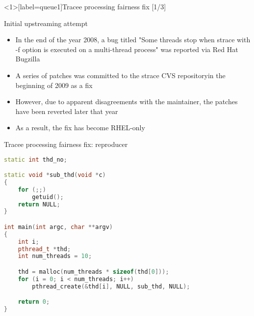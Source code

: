 \documentclass[unicode]{beamer}
\begin{document}
\begin{frame}<1>[label=queue1]{Tracee processing fairness fix \hfill [1/3]}
\begin{block}{\large Initial upstreaming attempt}
\begin{itemize}
  \item In the end of the year 2008, a bug titled "Some threads stop when
        strace with -f option is executed on a multi-thread process"
        was reported via Red Hat Bugzilla
  \pause
  \item A series of patches was committed to the strace CVS repository\footnotemark[1]\footnotemark[2]\footnotemark[3]\footnotemark[4]
        in the beginning of 2009 as a fix
  \item However, due to apparent disagreements with the maintainer\footnotemark[5]\footnotemark[6]\footnotemark[7],
        the patches have been reverted later that year\footnotemark[8]
  \item As a result, the fix has become RHEL-only
\end{itemize}
\end{block}
\end{frame}

\begin{frame}[fragile]{Tracee processing fairness fix: reproducer}
\begin{scriptsize}
\begin{lstlisting}[language=C++,basicstyle=\ttfamily]
static int thd_no;

static void *sub_thd(void *c)
{
	for (;;)
		getuid();
	return NULL;
}

int main(int argc, char **argv)
{
	int i;
	pthread_t *thd;
	int num_threads = 10;

	thd = malloc(num_threads * sizeof(thd[0]));
	for (i = 0; i < num_threads; i++)
		pthread_create(&thd[i], NULL, sub_thd, NULL);

	return 0;
}
\end{lstlisting}
\end{scriptsize}
\end{frame}
\end{document}
